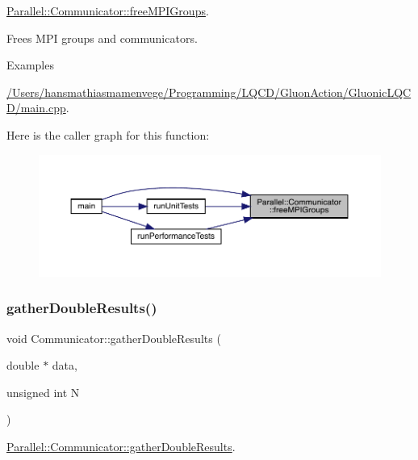 \mbox{\hyperlink{class_parallel_1_1_communicator_aca0ac979aee1a649dbe5d4582b06a707}{Parallel\+::\+Communicator\+::free\+M\+P\+I\+Groups}}. 

Frees M\+PI groups and communicators. \begin{Desc}
\item[Examples]\par
\mbox{\hyperlink{_2_users_2hansmathiasmamenvege_2_programming_2_l_q_c_d_2_gluon_action_2_gluonic_l_q_c_d_2main_8cpp-example}{/\+Users/hansmathiasmamenvege/\+Programming/\+L\+Q\+C\+D/\+Gluon\+Action/\+Gluonic\+L\+Q\+C\+D/main.\+cpp}}.\end{Desc}
Here is the caller graph for this function\+:
\nopagebreak
\begin{figure}[H]
\begin{center}
\leavevmode
\includegraphics[width=350pt]{class_parallel_1_1_communicator_aca0ac979aee1a649dbe5d4582b06a707_icgraph}
\end{center}
\end{figure}
\mbox{\label{class_parallel_1_1_communicator_ae5739683ff54a7c39af6e37920e70ea5}} 
\subsubsection{\texorpdfstring{gatherDoubleResults()}{gatherDoubleResults()}}
{\footnotesize\ttfamily void Communicator\+::gather\+Double\+Results (\begin{DoxyParamCaption}\item[{double $\ast$}]{data,  }\item[{unsigned int}]{N }\end{DoxyParamCaption})\hspace{0.3cm}{\ttfamily [static]}}



\mbox{\hyperlink{class_parallel_1_1_communicator_ae5739683ff54a7c39af6e37920e70ea5}{Parallel\+::\+Communicator\+::gather\+Double\+Results}}. 



